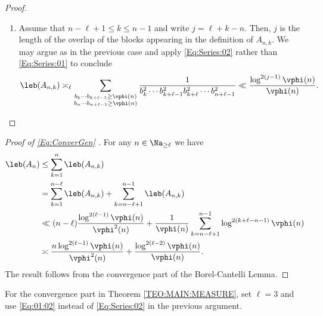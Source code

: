 \documentclass[12pt,a4paper]{amsart}
\begin{document}
\begin{proof}
\begin{enumerate}[1.]
\begin{align*}
\end{align*}
The last estimate follows from \eqref{Eq:Series:01}.
\item Assume that $n-\ell +1 \leq k\leq n- 1$ and write $j=\ell+k-n$. Then, $j$ is the length of the overlap of the blocks appearing in the definition of $A_{n,k}$. We may argue as in the previous case and apply \eqref{Eq:Series:02} rather than \eqref{Eq:Series:01} to conclude
\[
\leb(A_{n,k})
\asymp_{\ell}
\sum_{\substack{b_{k}\cdots b_{k+\ell-1}\geq \vphi(n)\\b_{n}\cdots b_{n+\ell-1}\geq \vphi(n)}}
\frac{1}{b_{k}^2\cdots b_{k+\ell-1}^2b_{k+\ell}^2 \cdots b_{n+\ell-1}^2}
\ll 
\frac{\log^{2(j-1)} \vphi(n)}{\vphi(n)}.
\]
\end{enumerate}
\end{proof}
\begin{proof}[Proof of \eqref{Eq:ConverGen} ]
For any $n\in\Na_{\geq \ell}$ we have
\begin{align*}
\leb(A_n)
&\leq 
\sum_{k=1}^{n} \leb(A_{n,k}) \nonumber\\
&=
\sum_{k=1}^{n-\ell} \leb(A_{n,k}) + \sum_{k=n-\ell+1}^{n-1} \leb(A_{n,k}) \nonumber\\
&\ll
(n-\ell)\frac{\log^{2(\ell-1)}\vphi(n)}{\vphi^2(n)} + \frac{1}{\vphi(n)}\sum_{k=n-\ell+1}^{n-1} \log^{2(k+\ell-n-1)}\vphi(n) \nonumber\\
&\asymp
\frac{n\log^{2(\ell-1)}\vphi(n)}{\vphi^2(n)} + \frac{\log^{2(\ell-2)}\vphi(n)}{\vphi(n)}.
\end{align*}
The result follows from the convergence part of the Borel-Cantelli Lemma.
\end{proof}
For the convergence part in Theorem \ref{TEO:MAIN:MEASURE}, set $\ell=3$ and use \eqref{Eq:01:02} instead of \eqref{Eq:Series:02} in the previous argument.
\end{document}
